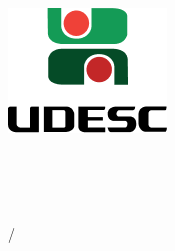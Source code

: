 \thispagestyle{empty}
\begin{center}
	\begin{minipage}[!]{\linewidth}
		\begin{minipage}[!]{.19\linewidth}
			\includegraphics[width=\textwidth]{img/logo.png}
		\end{minipage}
		\begin{minipage}[!]{.8\linewidth}
			\center
			\textsf{
				\large{
					\instituicao \\ \vspace{0.1cm}
					\centro \\	\vspace{0.17cm}			
					\departamento \\	\vspace{0.17cm}
					\disciplina
				}	
			}		
		\end{minipage}	
	\end{minipage}
	
	\vspace{5cm}
	\autor
	
	\vspace{2cm}
	\textbf{\titulo}%
	
	\vfill
	
	\cidade/\estado
	
	\ano
\end{center}


